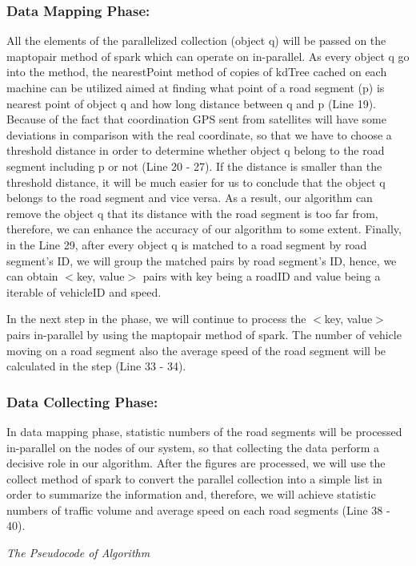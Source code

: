 \documentclass{acm_proc_article-sp}
\begin{document}
\subsubsection{Data Mapping Phase:} All the elements of the parallelized collection (object q) will be passed on the maptopair method of spark which can operate on in-parallel. As every object q go into the method, the nearestPoint method of copies of kdTree cached on each machine can be utilized aimed at finding what point of a road segment (p) is nearest point of object q and how long distance between q and p (Line 19). Because of the fact that coordination GPS sent from satellites will have some deviations in comparison with the real coordinate, so that we have to choose a threshold distance in order to determine whether object q belong to the road segment including p or not (Line 20 - 27). If the distance is smaller than the threshold distance, it will be much easier for us to conclude that the object q belongs to the road segment and vice versa. As a result, our algorithm can remove the object q that its distance with the road segment is too far from, therefore, we can enhance the accuracy of our algorithm to some extent. Finally, in the Line 29, after every object q is matched to a road segment by road segment’s ID, we will group the matched pairs by road segment’s ID, hence, we can obtain $<$key, value$>$ pairs with key being a roadID and value being a iterable of vehicleID and speed.

\setlength{\parindent}{0.7cm} In the next step in the phase, we will continue to process the $<$key, value$>$ pairs in-parallel by using the maptopair method of spark. The number of vehicle moving on a road segment also the average speed of the road segment will be calculated in the step (Line 33 - 34).

\subsubsection{Data Collecting Phase:} In data mapping phase, statistic numbers of the road segments will be processed in-parallel on the nodes of our system, so that collecting the data perform a decisive role in our algorithm. After the figures are processed, we will use the collect method of spark to convert the parallel collection into a simple list in order to summarize the information and, therefore, we will achieve statistic numbers of traffic volume and average speed on each road segments (Line 38 - 40).


{\it The Pseudocode of Algorithm}	
\begin{verbatim}

\end{verbatim}
%
\noindent
\end{document}
